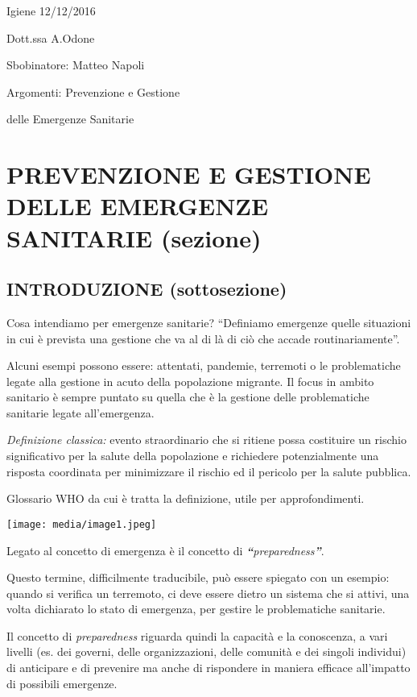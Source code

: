 \documentclass[]{article}
\date{}
\begin{document}
Igiene 12/12/2016

Dott.ssa A.Odone

Sbobinatore: Matteo Napoli

Argomenti: Prevenzione e Gestione

delle Emergenze Sanitarie

\section{PREVENZIONE E GESTIONE DELLE EMERGENZE SANITARIE
(sezione)}\label{prevenzione-e-gestione-delle-emergenze-sanitarie-sezione}

\subsection{INTRODUZIONE
(sottosezione)}\label{introduzione-sottosezione}

Cosa intendiamo per emergenze sanitarie? ``Definiamo emergenze quelle
situazioni in cui è prevista una gestione che va al di là di ciò che
accade routinariamente''.

Alcuni esempi possono essere: attentati, pandemie, terremoti o le
problematiche legate alla gestione in acuto della popolazione migrante.
Il focus in ambito sanitario è sempre puntato su quella che è la
gestione delle problematiche sanitarie legate all'emergenza.

\emph{Definizione classica:} evento straordinario che si ritiene possa
costituire un rischio significativo per la salute della popolazione e
richiedere potenzialmente una risposta coordinata per minimizzare il
rischio ed il pericolo per la salute pubblica.

Glossario WHO da cui è tratta la definizione, utile per approfondimenti.

\texttt{[image: media/image1.jpeg]}

Legato al concetto di emergenza è il concetto di
\emph{\textbf{``}preparedness\textbf{''}}.

Questo termine, difficilmente traducibile, può essere spiegato con un
esempio: quando si verifica un terremoto, ci deve essere dietro un
sistema che si attivi, una volta dichiarato lo stato di emergenza, per
gestire le problematiche sanitarie.

Il concetto di \emph{preparedness} riguarda quindi la capacità e la
conoscenza, a vari livelli (es. dei governi, delle organizzazioni, delle
comunità e dei singoli individui) di anticipare e di prevenire ma anche
di rispondere in maniera efficace all'impatto di possibili emergenze.
\end{document}
